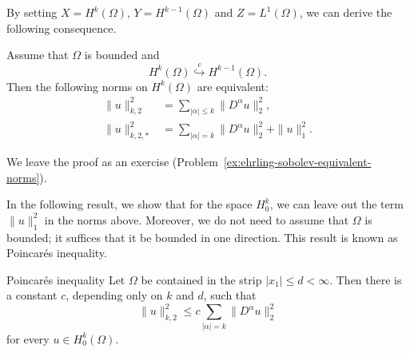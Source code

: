 By setting $X=H^k(\Omega)$, $Y=H^{k-1}(\Omega)$ and $Z=L^1(\Omega)$, we can derive the following consequence.

\begin{Corollary}
\label{cor:ehrling-sobolev-equivalent-norms}
Assume that $\Omega$ is bounded and\[H^k(\Omega)\overset{c}{\hookrightarrow}H^{k-1}(\Omega).\]Then the following norms on $H^k(\Omega)$ are equivalent:
\begin{equation}\label{eq:sobolev-ehrling-equivalent-norms}
\begin{aligned}
\|u\|_{k,2}^2&=\sum_{|\alpha|\leq k}\|D^\alpha u\|_2^2,\\
\|u\|_{k,2,*}^2&=\sum_{|\alpha|=k}\|D^\alpha u\|_2^2+\|u\|_1^2.
\end{aligned}
\end{equation}

\end{Corollary}

We leave the proof as an exercise (Problem~\ref{ex:ehrling-sobolev-equivalent-norms}).

In the following result, we show that for the space $H_0^k$, we can leave out the term $\|u\|_1^2$ in the norms above. Moreover, we do not need to assume that $\Omega$ is bounded; it suffices that it be bounded in one direction. This result is known as Poincaré\textquotesingle s inequality.

\begin{Theorem}{Poincaré\textquotesingle s inequality}
\label{thm:poincare-zero-boundary-highest-derivatives}
Let $\Omega$ be contained in the strip $|x_1|\leq d<\infty$. Then there is a constant $c$, depending only on $k$ and $d$, such that
\begin{equation}\label{eq:poincare-zero-boundary-highest-derivative-control}
\|u\|_{k,2}^2\leq c\sum_{|\alpha|=k}\|D^\alpha u\|_2^2
\end{equation}
for every $u\in H_0^k(\Omega)$.
\end{Theorem}

\begingroup
{}
\renewcommand{\endProof}{\par\nobreak\hfill$\blacksquare$\par\vspace{0.1cm}}
\endgroup

